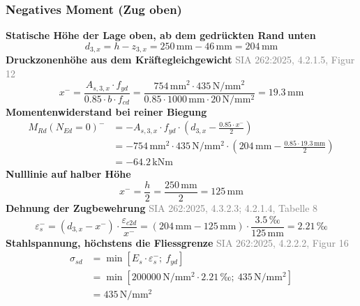 \documentclass[11pt,a4paper]{article}
\newcommand{\normref}[1]{{\small\textcolor{gray}{#1}}}
\begin{document}
\subsubsection{Negatives Moment (Zug oben)}
\noindent\textbf{Statische Höhe der Lage oben, ab dem gedrückten Rand unten}
\begin{equation*}
d_{3,x} = h - z_{3,x} = 250\,\mathrm{mm} - 46\,\mathrm{mm} = 204\,\mathrm{mm}
\end{equation*}
\noindent\textbf{Druckzonenhöhe aus dem Kräftegleichgewicht} \hfill \normref{SIA 262:2025, 4.2.1.5, Figur 12}
\begin{equation*}
x^{-} = \frac{A_{s,3,x} \cdot f_{yd}}{0.85 \cdot b \cdot f_{cd}} = \frac{754\,\mathrm{mm}^{2} \cdot 435\,\mathrm{N}/\mathrm{mm}^{2}}{0.85 \cdot 1000\,\mathrm{mm} \cdot 20\,\mathrm{N}/\mathrm{mm}^{2}} = 19.3\,\mathrm{mm}
\end{equation*}
\noindent\textbf{Momentenwiderstand bei reiner Biegung}
\begin{equation*}
\begin{aligned}
  M_{Rd}(N_{Ed}=0)^{-} &= -A_{s,3,x} \cdot f_{yd} \cdot \left(d_{3,x} - \frac{0.85 \cdot x^{-}}{2}\right) \\
  &= -754\,\mathrm{mm}^{2} \cdot 435\,\mathrm{N}/\mathrm{mm}^{2} \cdot \left(204\,\mathrm{mm} - \frac{0.85 \cdot 19.3\,\mathrm{mm}}{2}\right) \\
  &= -64.2\,\mathrm{kNm}
\end{aligned}
\end{equation*}
\noindent\textbf{Nulllinie auf halber Höhe}
\begin{equation*}
x^{-} = \frac{h}{2} = \frac{250\,\mathrm{mm}}{2} = 125\,\mathrm{mm}
\end{equation*}
\noindent\textbf{Dehnung der Zugbewehrung} \hfill \normref{SIA 262:2025, 4.3.2.3; 4.2.1.4, Tabelle 8}
\begin{equation*}
\varepsilon_s^{-} = \left(d_{3,x} - x^{-}\right) \cdot \frac{\varepsilon_{c2d}}{x^{-}} = \left(204\,\mathrm{mm} - 125\,\mathrm{mm}\right) \cdot \frac{3.5\,\text{‰}}{125\,\mathrm{mm}} = 2.21\,\text{‰}
\end{equation*}
\noindent\textbf{Stahlspannung, höchstens die Fliessgrenze} \hfill \normref{SIA 262:2025, 4.2.2.2, Figur 16}
\begin{equation*}
\begin{aligned}
  \sigma_{sd} &= \min\left[E_s \cdot \varepsilon_s^{-};\ f_{yd}\right] \\
  &= \min\left[200000\,\mathrm{N}/\mathrm{mm}^{2} \cdot 2.21\,\text{‰};\ 435\,\mathrm{N}/\mathrm{mm}^{2}\right] \\
  &= 435\,\mathrm{N}/\mathrm{mm}^{2}
\end{aligned}
\end{equation*}
\end{document}
